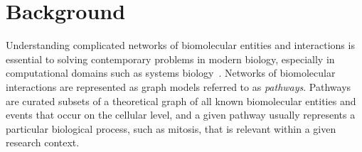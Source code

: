 \documentclass[twocolumn]{bmcart}%
\begin{document}
\begin{frontmatter}
\begin{abstractbox}

\begin{keyword}
\end{keyword}


\end{abstractbox}
%

\end{frontmatter}



\section*{Background}

Understanding complicated networks of biomolecular entities and interactions is essential to solving contemporary problems in modern biology, especially in computational domains such as systems biology~\cite{hanahan2011hallmarks}.
Networks of biomolecular interactions are represented as graph models referred to as \emph{pathways}.
Pathways are curated subsets of a theoretical graph of all known biomolecular entities and events that occur on the cellular level, and a given pathway usually represents a particular biological process, such as mitosis, that is relevant within a given research context.
\end{document}
